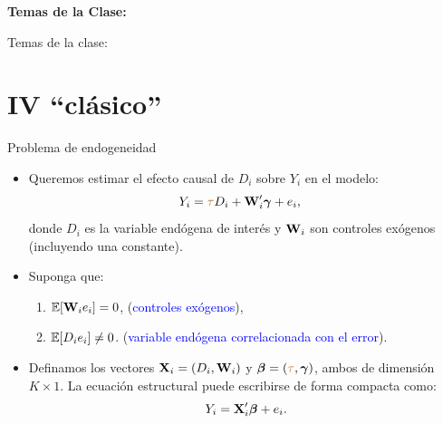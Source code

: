 \documentclass[10pt, xcolor=dvipsnames]{beamer}
\subtitle{Variables Instrumentales}
\begin{document}
	\beamertemplatenavigationsymbolsempty	
\begin{frame}[plain]%
	\titlepage
	\vspace{-0.4cm}
\textbf{Temas de la Clase:} \\ \vspace{0.3cm}
	\tableofcontents
\end{frame}

\begin{frame}{Temas de la clase:}
	\tableofcontents
\end{frame}

\section{IV ``clásico''}

\begin{frame}{Problema de endogeneidad}
\begin{itemize}
    \item Queremos estimar el efecto causal de $D_i$ sobre $Y_i$ en el modelo:
    \begin{align*}
    \begin{split}
    Y_{i} &= \textcolor{brown}{\tau} D_i + \textbf{W}'_{i}\boldsymbol{\gamma} + e_{i},
    \end{split}
    \end{align*}
    donde $D_i$ es la variable endógena de interés y $\textbf{W}_i$ son controles exógenos (incluyendo una constante).
    \vspace{1em}
    \item Suponga que:
    \smallspace
    \begin{enumerate}
    	\item $\operatorname{\mathbb{E}}[\textbf{W}_{i}e_i] = 0$, \hspace{2em} (\textcolor{blue}{controles exógenos}),
    	\item $\operatorname{\mathbb{E}}[D_i e_i] \neq 0$. \hspace{2.25em} (\textcolor{blue}{variable endógena correlacionada con el error}).
    \end{enumerate}	
    \vspace{1em}
    \item Definamos los vectores \(\textbf{X}_i = (D_i, \textbf{W}_i)\) y \(\boldsymbol{\beta} = (\textcolor{brown}{\tau}, \boldsymbol{\gamma})\), ambos de dimensión \(K \times 1\). La ecuación estructural puede escribirse de forma compacta como:
    \begin{align*}
        Y_i = \textbf{X}'_i \boldsymbol{\beta} + e_i.
    \end{align*}
\end{itemize}	
\end{frame}	
\end{document}
